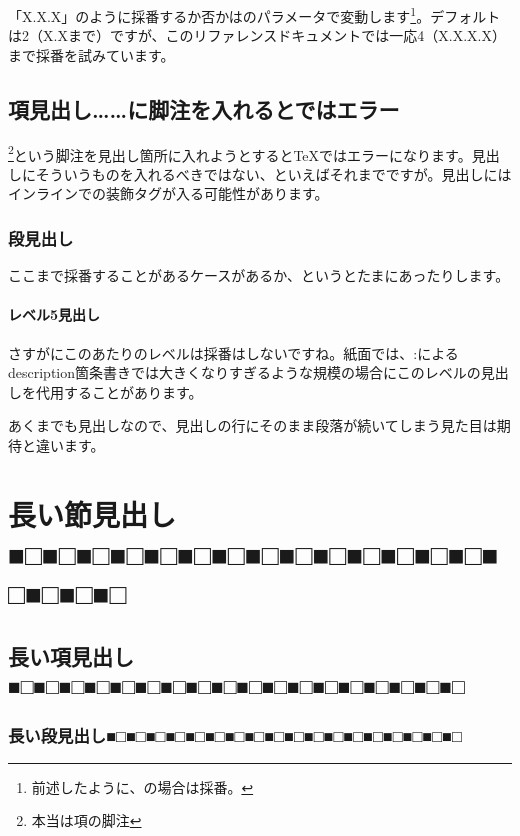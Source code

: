 「X.X.X」のように採番するか否かはのパラメータで変動します\footnote{前述したように、の場合は採番。}。デフォルトは2（X.Xまで）ですが、このリファレンスドキュメントでは一応4（X.X.X.X）まで採番を試みています。

\subsection{項見出し……に脚注を入れるとではエラー}
\label{sec:1-1-1}

\footnote{本当は項の脚注}という脚注を見出し箇所に入れようとするとTeXではエラーになります。見出しにそういうものを入れるべきではない、といえばそれまでですが。見出しにはインラインでの装飾タグが入る可能性があります。

\subsubsection{段見出し}
\label{sec:1-1-1-1}

ここまで採番することがあるケースがあるか、というとたまにあったりします。

\paragraph*{レベル5見出し}
\label{sec:1-1-1-1-1}

さすがにこのあたりのレベルは採番はしないですね。紙面では、:によるdescription箇条書きでは大きくなりすぎるような規模の場合にこのレベルの見出しを代用することがあります。

あくまでも見出しなので、見出しの行にそのまま段落が続いてしまう見た目は期待と違います。

\section{長い節見出し■□■□■□■□■□■□■□■□■□■□■□■□■□■□■□■□■□■□}
\label{sec:1-2}

\subsection{長い項見出し■□■□■□■□■□■□■□■□■□■□■□■□■□■□■□■□■□■□}
\label{sec:1-2-1}

\subsubsection{長い段見出し■□■□■□■□■□■□■□■□■□■□■□■□■□■□■□■□■□■□}
\label{sec:1-2-1-1}

